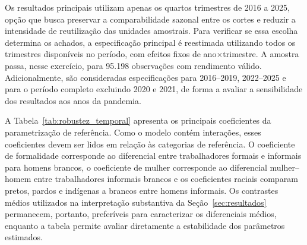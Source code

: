 \documentclass[12pt,a4paper]{article}
\begin{document}
Os resultados principais utilizam apenas os quartos trimestres de 2016 a 2025,
opção que busca preservar a comparabilidade sazonal entre os cortes e reduzir
a intensidade de reutilização das unidades amostrais. Para verificar se essa
escolha determina os achados, a especificação principal é reestimada utilizando
todos os trimestres disponíveis no período, com efeitos fixos de
ano$\times$trimestre. A amostra passa, nesse exercício, para 95.198
observações com rendimento válido. Adicionalmente, são consideradas
especificações para 2016--2019, 2022--2025 e para o período completo excluindo
2020 e 2021, de forma a avaliar a sensibilidade dos resultados aos anos da
pandemia.

A Tabela~\ref{tab:robustez_temporal} apresenta os principais coeficientes da
parametrização de referência. Como o modelo contém interações, esses
coeficientes devem ser lidos em relação às categorias de referência. O
coeficiente de formalidade corresponde ao diferencial entre trabalhadores
formais e informais para homens brancos, o coeficiente de mulher corresponde
ao diferencial mulher--homem entre trabalhadores informais brancos e os
coeficientes raciais comparam pretos, pardos e indígenas a brancos entre
homens informais. Os contrastes médios utilizados na interpretação substantiva
da Seção~\ref{sec:resultados} permanecem, portanto, preferíveis para caracterizar
os diferenciais médios, enquanto a tabela permite avaliar diretamente a
estabilidade dos parâmetros estimados.
\end{document}
